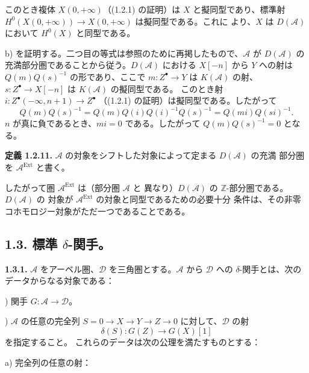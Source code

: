 \clearpage
{}%
\begingroup\small\setlength{\parskip}{0pt}\setlength{\emergencystretch}{1.5em}
\setlength{\abovedisplayskip}{4pt plus 2pt minus 2pt}%
\setlength{\belowdisplayskip}{4pt plus 2pt minus 2pt}%

このとき複体 $X(0,+\infty)$（(1.2.1) の証明）は $X$ と擬同型であり、標準射
$H^0(X(0,+\infty))\longrightarrow X(0,+\infty)$ は擬同型である。これに
より、$X$ は $D(\mathcal A)$ において $H^0(X)$ と同型である。

b) を証明する。二つ目の等式は参照のために再掲したもので、$\mathcal A$ が
$D(\mathcal A)$ の充満部分圏であることから従う。$D(\mathcal A)$ における
$X[-n]$ から $Y$ への射は $Q(m)Q(s)^{-1}$ の形であり、ここで
$m\colon Z^\bullet\longrightarrow Y$ は $K(\mathcal A)$ の射、
$s\colon Z^\bullet\longrightarrow X[-n]$ は $K(\mathcal A)$ の擬同型である。
このとき射 $i\colon Z^\bullet(-\infty,n+1)\longrightarrow Z^\bullet$
（(1.2.1) の証明）は擬同型である。したがって
\[
Q(m)Q(s)^{-1}=Q(m)Q(i)Q(i)^{-1}Q(s)^{-1}=Q(mi)Q(si)^{-1}.
\]
$n$ が真に負であるとき、$mi=0$ である。したがって
$Q(m)Q(s)^{-1}=0$ となる。

\medskip\noindent\textbf{定義 1.2.11.}\quad
$\mathcal A$ の対象をシフトした対象によって定まる $D(\mathcal A)$ の充満
部分圏を $\mathcal A^{\operatorname{Ext}}$ と書く。

したがって圏 $\mathcal A^{\operatorname{Ext}}$ は（部分圏 $\mathcal A$ と
異なり）$D(\mathcal A)$ の $\mathbb Z$-部分圏である。$D(\mathcal A)$ の
対象が $\mathcal A^{\operatorname{Ext}}$ の対象と同型であるための必要十分
条件は、その非零コホモロジー対象がただ一つであることである。

\subsection*{1.3. 標準 \texorpdfstring{$\delta$}{delta}-関手。}

\noindent\textbf{1.3.1.}\quad
$\mathcal A$ をアーベル圏、$\mathcal D$ を三角圏とする。$\mathcal A$ から
$\mathcal D$ への $\delta$-関手とは、次のデータからなる対象である：

) 関手 $G\colon\mathcal A\longrightarrow\mathcal D$。

) $\mathcal A$ の任意の完全列
$S=0\longrightarrow X\longrightarrow Y\longrightarrow Z\longrightarrow0$
に対して、$\mathcal D$ の射
\[
\delta(S)\colon G(Z)\longrightarrow G(X)[1]
\]
を指定すること。
これらのデータは次の公理を満たすものとする：

\noindent a) 完全列の任意の射：

\begin{center}
\end{center}
\endgroup
